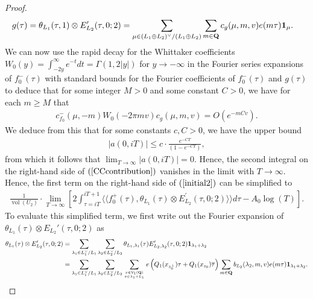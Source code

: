 \documentclass{amsart}
\theoremstyle{definition}
\begin{document}
\begin{proof}
\begin{align*} g(\tau) = \theta_{L_1}(\tau, 1) \otimes E^{\prime}_{L_2}(\tau, 0; 2) &=
\sum\limits_{ \mu \in (L_1 \oplus L_2)^{\vee}/(L_1 \oplus L_2 )  } \sum\limits_{ m \in {\bf{Q}} }
c_g(\mu, m, v) e(m \tau) {\bf{1}}_{\mu} . \end{align*}
We can now use the rapid decay for the Whittaker coefficients 
$W_0(y) = \int_{-2y}^{\infty} e^{-t} dt = \Gamma(1, 2 \vert y \vert)$ for $y \rightarrow - \infty$
in the Fourier series expansions of $f_0^-(\tau)$ with standard bounds for the Fourier coefficients 
of $f_0^-(\tau)$ and $g(\tau)$ to deduce that for some integer $M >0$ and some constant $C>0$, we have for each $m \geq M$ that 
\begin{align*} c_{f_0}^-(\mu, -m) W_0(-2 \pi m v) c_g(\mu, m, v) = O\left( e^{- m C v}  \right). \end{align*}
We deduce from this that for some constants $c, C >0$, we have the upper bound
\begin{align*} \vert a(0, iT) \vert \leq c \cdot \frac{e^{-CT}}{(1 - e^{-CT})}, \end{align*}
from which it follows that $\lim_{T \rightarrow \infty} \vert a(0, iT) \vert = 0$.
Hence, the second integral on the right-hand side of $(\ref{CCcontribution})$ vanishes in the limit with $T \rightarrow \infty$.
Hence, the first term on the right-hand side of $(\ref{initial2})$ can be simplified to  
\begin{align}\label{RHS} \frac{1}{\operatorname{vol}(U_2)} \cdot \lim_{T \rightarrow \infty} 
\left[ 2 \int_{\tau = i T}^{iT +1} \langle \langle f_0^+(\tau), \theta_{L_1}(\tau) 
\otimes E^{\prime}_{L_2}(\tau, 0; 2)\rangle \rangle d \tau -  A_0 \log(T) \right]. \end{align} 
To evaluate this simplified term, we first write out the Fourier expansion of $\theta_{L_1}(\tau) \otimes E_{L_2}'(\tau, 0; 2)$ as 
\begin{align*} \theta_{L_1}(\tau) \otimes E_{L_2}'(\tau, 0; 2) 
&= \sum\limits_{ \lambda_1 \in L_1^{\vee}/L_1 } \sum\limits_{\lambda_2 \in L_2^{\vee}/L_2}
\theta_{L_1, \lambda_1}(\tau) E_{L_2, \lambda_2}'(\tau, 0; 2) {\bf{1}}_{\lambda_1 + \lambda_2} \\
&=  \sum\limits_{ \lambda_1 \in L_1^{\vee}/L_1 } \sum\limits_{\lambda_2 \in L_2^{\vee}/L_2}
\sum\limits_{ x \in V_1({\bf{Q}}) \atop x \in \lambda_1 + L_1 } e \left( Q_1(x_{z_0^{\perp}}) \tau + Q_1(x_{z_0}) \overline{\tau} \right) 
\sum\limits_{m \in {\bf{Q}}} b_{L_2}(\lambda_2, m, v) e(m \tau) {\bf{1}}_{\lambda_1 + \lambda_2}. \end{align*}

\end{proof}
\end{document}
